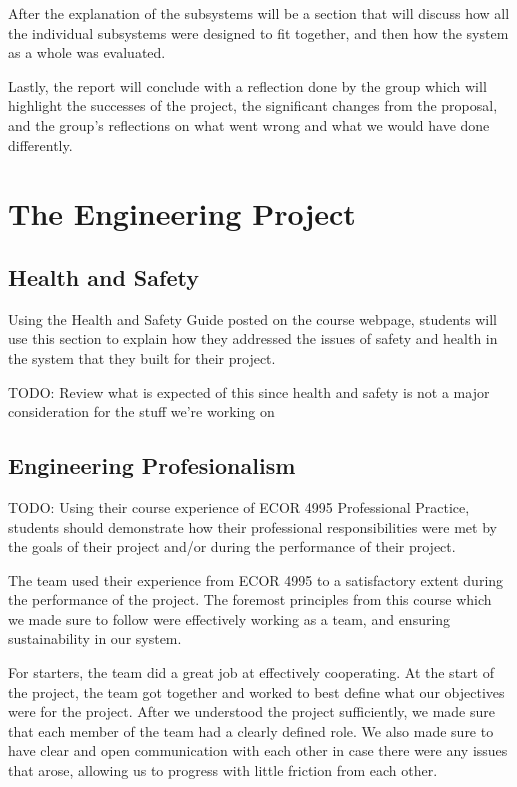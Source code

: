 \documentclass[titlepage,draft]{article}
\begin{document}
After the explanation of the subsystems will be a section that will discuss how all the individual subsystems were designed to fit together, and then how the system as a whole was evaluated.

Lastly, the report will conclude with a reflection done by the group which will highlight the successes of the project, the significant changes from the proposal, and the group's reflections on what went wrong and what we would have done differently.

\section{The Engineering Project}

\subsection{Health and Safety}
Using the Health and Safety Guide posted on the course webpage, students will use this section to explain how they addressed the issues of safety and health in the system that they built for their project.

TODO: Review what is expected of this since health and safety is not a major consideration for the stuff we're working on

\subsection{Engineering Profesionalism}
TODO: Using their course experience of ECOR 4995 Professional Practice, students should demonstrate how their professional responsibilities were met by the goals of their project and/or during the performance of their project.

The team used their experience from ECOR 4995 to a satisfactory extent during the performance of the project. The foremost principles from this course which we made sure to follow were effectively working as a team, and ensuring sustainability in our system.

For starters, the team did a great job at effectively cooperating. At the start of the project, the team got together and worked to best define what our objectives were for the project. After we understood the project sufficiently, we made sure that each member of the team had a clearly defined role. We also made sure to have clear and open communication with each other in case there were any issues that arose, allowing us to progress with little friction from each other.
\end{document}
